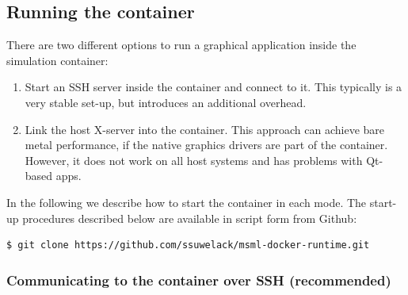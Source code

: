 \subsection{Running the container} 

There are two different options to run a graphical application inside the simulation container:
\begin{enumerate}
	\item Start an SSH server inside the container and connect to it. This typically is a very stable set-up, but introduces an additional overhead.
	\item Link the host X-server into the container. This approach can achieve bare metal performance, if the native graphics drivers are part of the container. However, it does not work on all host systems and has problems with Qt-based apps.	
\end{enumerate}

In the following we describe how to start the container in each mode. The start-up procedures described below are available in script form from Github:
 \begin{lstlisting}[language=sh, breaklines=true]
  $ git clone https://github.com/ssuwelack/msml-docker-runtime.git
\end{lstlisting}

\subsubsection{Communicating to the container over SSH (recommended)}

